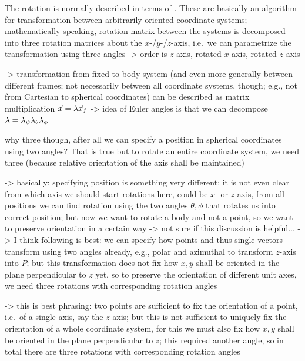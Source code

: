 \documentclass[../class_mech_main.tex]{subfiles}
\begin{document}
The rotation is normally described in terms of . These are basically an algorithm for transformation between arbitrarily oriented coordinate systems; mathematically speaking, rotation matrix between the systems is decomposed into three rotation matrices about the $x$-/$y$-/$z$-axis, i.e.~we can parametrize the transformation using three angles -> order is $z$-axis, rotated $x$-axis, rotated $z$-axis


-> transformation from fixed to body system (and even more generally between different frames; not necessarily between all coordinate systems, though; e.g., not from Cartesian to spherical coordinates) can be described as matrix multiplication $\vec{x} = \mathbf{\lambda} \vec{x}_f$ -> idea of Euler angles is that we can decompose $\mathbf{\lambda} = \mathbf{\lambda}_\psi \mathbf{\lambda}_\theta \mathbf{\lambda}_\phi$



why three though, after all we can specify a position in spherical coordinates using two angles? That is true but to rotate an entire coordinate system, we need three (because relative orientation of the axis shall be maintained)

-> basically: specifying position is something very different; it is not even clear from which axis we should start rotations here, could be $x$- or $z$-axis, from all positions we can find rotation using the two angles $\theta, \phi$ that rotates us into correct position; but now we want to rotate a body and not a point, so we want to preserve orientation in a certain way
-> not sure if this discussion is helpful...
-> I think following is best: we can specify how points and thus single vectors transform using two angles already, e.g., polar and azimuthal to transform $z$-axis into $P$; but this transformation does not fix how $x, y$ shall be oriented in the plane perpendicular to $z$ yet, so to preserve the orientation of different unit axes, we need three rotations with corresponding rotation angles

-> this is best phrasing: two points are sufficient to fix the orientation of a point, i.e.~of a single axis, say the $z$-axis; but this is not sufficient to uniquely fix the orientation of a whole coordinate system, for this we must also fix how $x, y$ shall be oriented in the plane perpendicular to $z$; this required another angle, so in total there are three rotations with corresponding rotation angles



\end{document}
